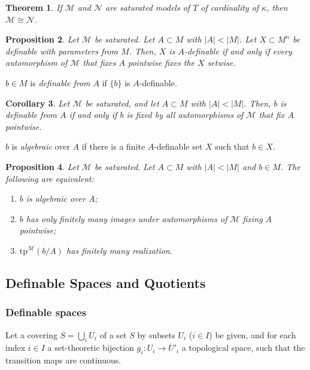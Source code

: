 \documentclass{amsart}
\newtheorem{theorem}{Theorem}[subsection]
\newtheorem{proposition}[theorem]{Proposition}
\newtheorem{corollary}[theorem]{Corollary}
\theoremstyle{definition}
\numberwithin{equation}{section}
\begin{document}
\begin{theorem}
  If $\mathcal{M}$ and $\mathcal{N}$ are saturated models of $T$ of cardinality of $\kappa$,
  then $\mathcal{M}\cong\mathcal{N}$.
\end{theorem}

\begin{proposition}
  Let $\mathcal{M}$ be saturated.
  Let $A \subset M$ with $|A| < |M|$.
  Let $X \subset M^n$ be definable with parameters from $M$.
  Then, $X$ is $A$-definable if and only if every automorphism of $\mathcal{M}$ that fixes $A$ pointwise fixes the $X$ setwise.
\end{proposition}

$b \in M$ is \emph{definable from $A$} if $\{b\}$ is $A$-definable.
\begin{corollary}
  Let $\mathcal{M}$ be saturated,
  and let $A \subset M$ with $|A| < |M|$.
  Then, $b$ is definable from $A$ if and only if $b$ is fixed by all automorphisms of $\mathcal{M}$ that fix $A$ pointwise.
\end{corollary}

$b$ is \emph{algebraic} over $A$ if there is a finite $A$-definable set $X$ such that $b\in X$.
\begin{proposition}
  Let $\mathcal{M}$ be saturated.
  Let $A \subset M$ with $|A| < |M|$ and $b \in M$.
  The following are equivalent:
  \begin{enumerate}[label = {\roman*)}]
    \item $b$ is algebraic over $A$;
    \item $b$ has only finitely many images under automorphisms of $\mathcal{M}$ fixing $A$ pointwise;
    \item $\mathrm{tp}^{\mathcal{M}}(b/A)$ has finitely many realization.
  \end{enumerate}
\end{proposition}

\subsection{Definable Spaces and Quotients}
\subsubsection{Definable spaces}
Let a covering $S = \bigcup_i U_i$ of a set $S$ by subsets $U_i$ ($i\in I$) be given,
and for each index $i \in I$ a set-theoretic bijection $g_i: U_i \to U'_i$ a topological space,
such that the transition maps are continuous.
\end{document}
